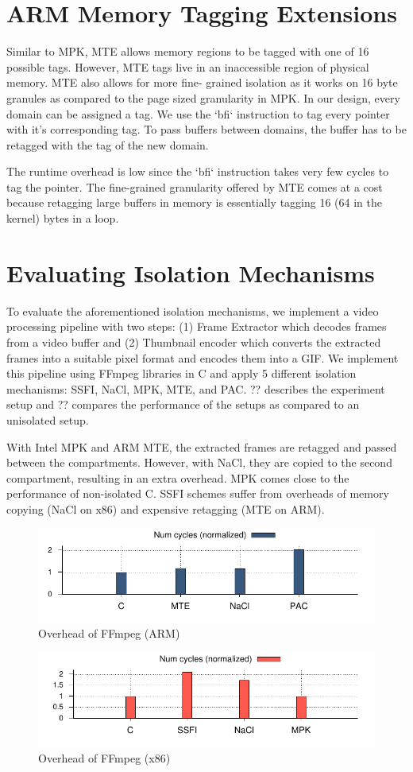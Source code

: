 \section{ARM Memory Tagging Extensions}
Similar to MPK, MTE allows memory regions to be tagged with one of 16 possible tags. However, MTE tags live in an inaccessible region of physical memory. MTE also allows for more fine- grained isolation as it works on 16 byte granules as compared to the page sized granularity in MPK. In our design, every domain can be assigned a tag. We use the ‘bfi‘ instruction to tag every pointer with it’s corresponding tag. To pass buffers between domains, the buffer has to be retagged with the tag of the new domain.

The runtime overhead is low since the ‘bfi‘ instruction takes very few cycles to tag the pointer. The fine-grained granularity offered by MTE comes at a cost because retagging large buffers in memory is essentially tagging 16 (64 in the kernel) bytes in a loop.

\section{Evaluating Isolation Mechanisms}
To evaluate the aforementioned isolation mechanisms, we implement a video processing pipeline with two steps: (1) Frame Extractor which decodes frames from a video buffer and (2) Thumbnail encoder which converts the extracted frames into a suitable pixel format and encodes them into a GIF. We implement this pipeline using FFmpeg libraries in C and apply 5 different isolation mechanisms: SSFI, NaCl, MPK, MTE, and PAC. ?? describes the experiment setup and ?? compares the performance of the setups as compared to an unisolated setup. 

With Intel MPK and ARM MTE, the extracted frames are retagged and passed between the compartments. However, with NaCl, they are copied to the second compartment, resulting in an extra overhead. MPK comes close to the performance of non-isolated C. SSFI schemes suffer from overheads of memory copying (NaCl on x86) and expensive retagging (MTE on ARM). 

\begin{figure}[H]
	\includegraphics[width=1.0\columnwidth]{figures/ffmpeg-arm.pdf}
\caption{Overhead of FFmpeg (ARM)}
	\label{fig:ffmpeg-arm}
\end{figure}

\begin{figure}[H]
	\includegraphics[width=1.0\columnwidth]{figures/ffmpeg-x86.pdf}
\caption{Overhead of FFmpeg (x86)}
	\label{fig:ffmpeg-x86}
\end{figure}